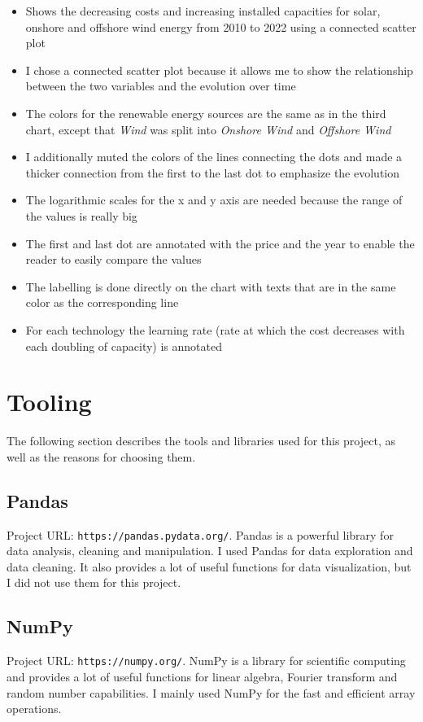 \documentclass{article}
\begin{document}
\begin{itemize}
    \item Shows the decreasing costs and increasing installed capacities for solar, onshore and offshore wind energy from 2010 to 2022 using a connected scatter plot
    \item I chose a connected scatter plot because it allows me to show the relationship between the two variables and the evolution over time
    \item The colors for the renewable energy sources are the same as in the third chart, except that \textit{Wind} was split into \textit{Onshore Wind} and \textit{Offshore Wind}
    \item I additionally muted the colors of the lines connecting the dots and made a thicker connection from the first to the last dot to emphasize the evolution
    \item The logarithmic scales for the x and y axis are needed because the range of the values is really big
    \item The first and last dot are annotated with the price and the year to enable the reader to easily compare the values
    \item The labelling is done directly on the chart with texts that are in the same color as the corresponding line
    \item For each technology the learning rate (rate at which the cost decreases with each doubling of capacity) is annotated
\end{itemize}

\newpage

\section{Tooling}

The following section describes the tools and libraries used for this project, as well as the reasons for choosing them.

\subsection{Pandas}
Project URL: \texttt{https://pandas.pydata.org/}.\newline
Pandas is a powerful library for data analysis, cleaning and manipulation.
I used Pandas for data exploration and data cleaning.
It also provides a lot of useful functions for data visualization, but I did not use them for this project.

\subsection{NumPy}
Project URL: \texttt{https://numpy.org/}.\newline
NumPy is a library for scientific computing and provides a lot of useful functions for linear algebra, Fourier transform and random number capabilities.
I mainly used NumPy for the fast and efficient array operations.
\end{document}
